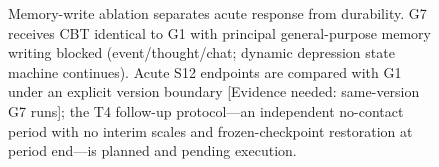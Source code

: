 \documentclass[sn-nature,pdflatex]{sn-jnl}
\begin{document}
\begin{figure}[h]
\centering
\caption{Memory-write ablation separates acute response from durability. G7 receives CBT identical to G1 with principal general-purpose memory writing blocked (event/thought/chat; dynamic depression state machine continues). Acute S12 endpoints are compared with G1 under an explicit version boundary [Evidence needed: same-version G7 runs]; the T4 follow-up protocol---an independent no-contact period with no interim scales and frozen-checkpoint restoration at period end---is planned and pending execution.}
\label{fig:cmech}
\end{figure}
\end{document}
